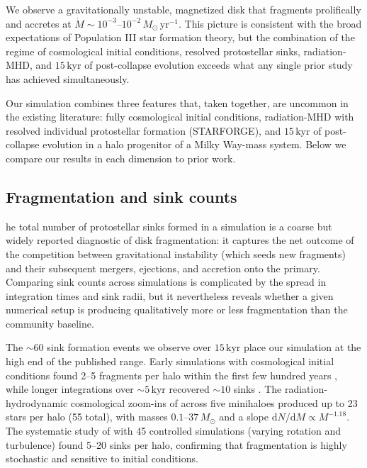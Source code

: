 \documentclass[twocolumn]{openjournal}
\newcommand{\Msun}{M_\odot}
\newcommand{\kyr}{\,\mathrm{kyr}}
\begin{document}
We observe a gravitationally unstable, magnetized disk that fragments prolifically and accretes at $\dot{M} \sim 10^{-3}$--$10^{-2}\,\Msun\,\mathrm{yr}^{-1}$.
This picture is consistent with the broad expectations of Population III star formation theory, but the combination of the regime of cosmological initial conditions, resolved protostellar sinks, radiation-MHD, and $15\kyr$ of post-collapse evolution exceeds what any single prior study has achieved simultaneously.

Our simulation combines three features that, taken together, are
uncommon in the existing literature: fully cosmological initial
conditions, radiation-MHD with resolved individual protostellar
formation (STARFORGE), and $15\kyr$ of post-collapse evolution in a
halo progenitor of a Milky Way-mass system.
Below we compare our results in each dimension to prior work.

\subsection{Fragmentation and sink counts}

he total number of protostellar sinks formed in a simulation is a coarse but widely reported diagnostic of disk fragmentation: it captures the net outcome of the competition between gravitational instability (which seeds new fragments) and their subsequent mergers, ejections, and accretion onto the primary.
Comparing sink counts across simulations is complicated by the spread in integration times and sink radii, but it nevertheless reveals whether a given numerical setup is producing qualitatively more or less fragmentation than the community baseline.

The $\sim 60$ sink formation events we observe over $15\kyr$ place
our simulation at the high end of the published range.
Early simulations with cosmological initial conditions found
2--5 fragments per halo within the first few hundred years
\citep{greif11, clark11}, while longer integrations over
$\sim 5\kyr$ recovered $\sim 10$ sinks \citep{stacy12}.
The radiation-hydrodynamic cosmological zoom-ins of
\citet{latif_khochfar22} across five minihaloes produced up to 23
stars per halo (55 total), with masses $0.1$--$37\,\Msun$ and a
slope $\mathrm{d}N/\mathrm{d}M \propto M^{-1.18}$.
The systematic study of \citet{wollenberg20} with 45 controlled
simulations (varying rotation and turbulence) found 5--20 sinks per
halo, confirming that fragmentation is highly stochastic and sensitive
to initial conditions.
\end{document}
